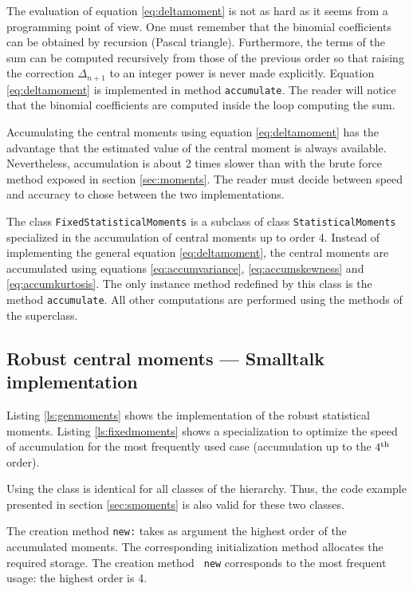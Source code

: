 \documentclass[twoside]{book}
\begin{document}
The evaluation of equation \ref{eq:deltamoment} is not as hard as
it seems from a programming point of view. One must remember that
the binomial coefficients can be obtained by recursion (Pascal
triangle). Furthermore, the terms of the sum can be computed
recursively from those of the previous order so that raising the
correction $\Delta_{n+1}$ to an integer power is never made
explicitly. Equation \ref{eq:deltamoment} is implemented in method
{\tt accumulate}. The reader will notice that the binomial
coefficients are computed inside the loop computing the sum.

Accumulating the central moments using equation
\ref{eq:deltamoment} has the advantage that the estimated value of
the central moment is always available. Nevertheless, accumulation
is about 2 times slower than with the brute force method exposed
in section \ref{sec:moments}. The reader must decide between speed
and accuracy to chose between the two implementations.

The class {\tt FixedStatisticalMoments} is a subclass of class
{\tt StatisticalMoments} specialized in the accumulation of
central moments up to order 4. Instead of implementing the general
equation \ref{eq:deltamoment}, the central moments are accumulated
using equations \ref{eq:accumvariance}, \ref{eq:accumskewness} and
\ref{eq:accumkurtosis}. The only instance method redefined by this
class is the method {\tt accumulate}. All other computations are
performed using the methods of the superclass.

\subsection{Robust central moments --- Smalltalk implementation}
\label{sec:srobustmoment} Listing
\ref{ls:genmoments} shows the implementation of the robust
statistical moments. Listing \ref{ls:fixedmoments} shows a
specialization to optimize the speed of accumulation for the most
frequently used case (accumulation up to the $4^{\mathop{\rm th}}$ order).

Using the class is identical for all classes of the hierarchy.
Thus, the code example presented in section \ref{sec:smoments} is
also valid for these two classes.

The creation method {\tt new:} takes as argument the highest order
of the accumulated moments. The corresponding initialization
method allocates the required storage. The creation method {\tt
new} corresponds to the most frequent usage: the highest order is
4.
\end{document}
